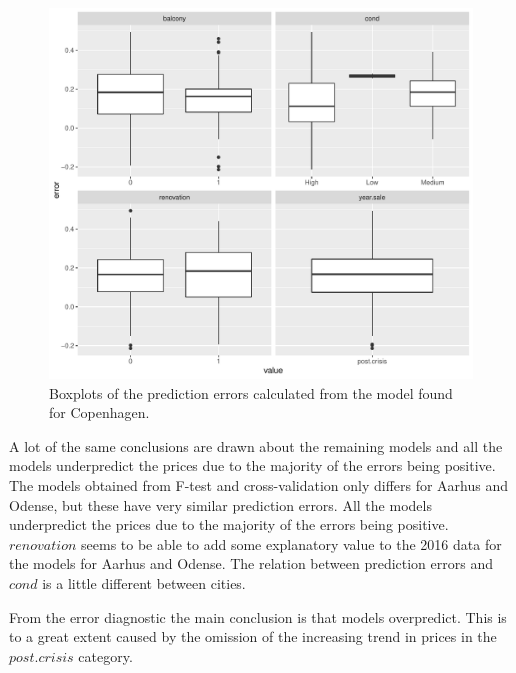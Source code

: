 \begin{figure}[H]
        \centering
      \includegraphics[width = 0.7 \textwidth]{figures/Nanna/errors_factors.pdf}
      \caption{Boxplots of the prediction errors calculated from the model found for Copenhagen.}
      \label{fig:error_factor}
\end{figure}
A lot of the same conclusions are drawn about the remaining models and all the models underpredict the prices due to the majority of the errors being positive.
The models obtained from F-test and cross-validation only differs for Aarhus and Odense, but these have very similar prediction errors.
All the models underpredict the prices due to the majority of the errors being positive.
$renovation$ seems to be able to add some explanatory value to the 2016 data for the models for Aarhus and Odense.  
The relation between prediction errors and $cond$ is a little different between cities. 

From the error diagnostic the main conclusion is that models overpredict.
This is to a great extent caused by the omission of the increasing trend in prices in the $post.crisis$ category. 